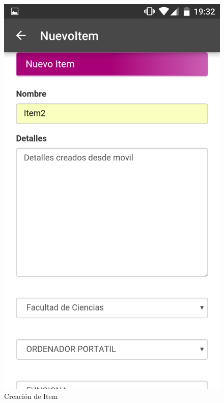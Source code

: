 \documentclass[a4paper,11pt]{book}
\begin{document}
\begin{figure}[H]
  \includegraphics[width=\linewidth]{imagenes/pruebas/movil/movil3.png}
  \caption{Creación de Item\cite{propio}}
\endminipage\hfill
{}

\end{figure}
\end{document}
